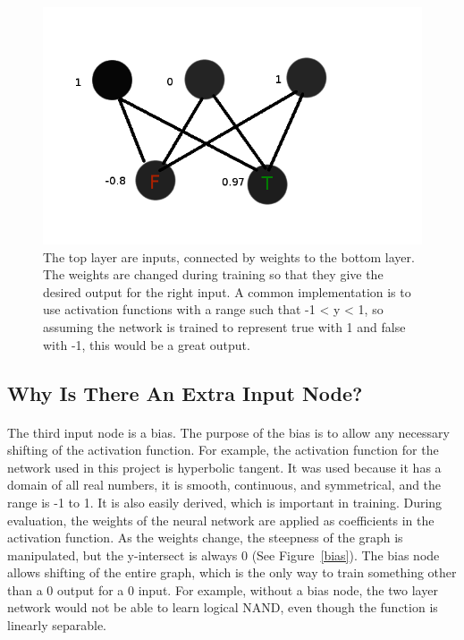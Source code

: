 \documentclass{article}
\begin{document}
    \begin{figure}
        \centering
        \includegraphics[scale=0.4]{images/perceptron.png}
        \caption{The top layer are inputs, connected by weights to the bottom 
            layer. The weights are changed during training so that they give the 
            desired output for the right input. A common implementation is to use 
            activation functions with a range such that -1 < y < 1, so assuming 
            the network is trained to represent true with 1 and false with -1, this 
            would be a great output.}
        \label{basicnetwork}
    \end{figure}

\subsection{Why Is There An Extra Input Node?}

    \paragraph{}The third input node is a bias. The purpose of the bias is 
    to allow any necessary shifting of the activation function. For example, the 
    activation function for the network used in this project is hyperbolic 
    tangent. It was used because it has a domain of all real numbers, it is smooth, 
    continuous, and symmetrical, and the range is -1 to 1. It is also easily 
    derived, which is important in training. During evaluation, the weights of the 
    neural network are applied as coefficients in the activation function. 
    As the weights change, the steepness of the graph is manipulated, but the 
    y-intersect is always 0 (See Figure~\ref{bias}). The bias node allows shifting
    of the entire graph, which is the only way to train something other than a 0 
    output for a 0 input. For example, without a bias node, the two layer network 
    would not be able to learn logical NAND, even though the function is linearly 
    separable.
\end{document}
